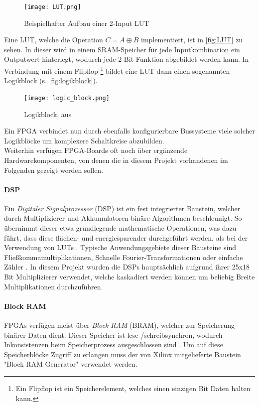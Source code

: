 \documentclass[a4paper,12pt,onesided]{report}
\begin{document}
\begin{figure}[H]
	\centering
	\texttt{[image: LUT.png]}
	\caption{Beispielhafter Aufbau einer 2-Input LUT}
	\label{fig:LUT}
\end{figure}

Eine LUT, welche die Operation $C = A \oplus B$ implementiert, ist in \autoref{fig:LUT} zu sehen. In dieser wird in einem SRAM-Speicher für jede Inputkombination ein Outputwert hinterlegt, wodurch jede 2-Bit Funktion abgebildet werden kann. In Verbindung mit einem Flipflop \footnote{Ein Flipflop ist ein Speicherelement, welches einen einzigen Bit Daten halten kann.} bildet eine LUT dann einen sogenannten Logikblock (s. \autoref{fig:logikblock}).\cite{fpgaDesign}

\begin{figure}[H]
	\centering
	\texttt{[image: logic\_block.png]}
	\caption{Logikblock, aus \cite{fpgaDesign}}
	\label{fig:logikblock}
\end{figure}

Ein FPGA verbindet nun durch ebenfalls konfigurierbare Bussysteme viele solcher Logikblöcke um komplexere Schaltkreise abzubilden.\\
Weiterhin verfügen FPGA-Boards oft noch über ergänzende Hardwarekomponenten, von denen die in diesem Projekt vorhandenen im Folgenden gezeigt werden sollen.

\paragraph{DSP}
Ein \textit{Digitaler Signalprozessor} (DSP) ist ein fest integrierter Baustein, welcher durch Multiplizierer und Akkumulatoren binäre Algorithmen beschleunigt.
So übernimmt dieser etwa grundlegende mathematische Operationen, was dazu führt, dass diese flächen- und energiesparender durchgeführt werden, als bei der Verwendung von LUTs \cite[S. 52]{dsps}.
Typische Anwendungsgebiete dieser Bausteine sind Fließkommamultiplikationen, Schnelle Fourier-Transformationen oder einfache Zähler \cite[S. 14]{dsps}. 
In diesem Projekt wurden die DSPs hauptsächlich aufgrund ihrer 25x18 Bit Multiplizierer verwendet, welche kaskadiert werden können um beliebig Breite Multiplikationen durchzuführen.

\paragraph{Block RAM}
FPGAs verfügen meist über \textit{Block RAM} (BRAM), welcher zur Speicherung binärer Daten dient. Dieser Speicher ist lese-/schreibsynchron, wodurch Inkonsistenzen beim Speicherprozess ausgeschlossen sind \cite[S. 11]{bram}. Um auf diese Speicherblöcke Zugriff zu erlangen muss der von Xilinx mitgelieferte Baustein "Block RAM Generator" verwendet werden.
\end{document}
